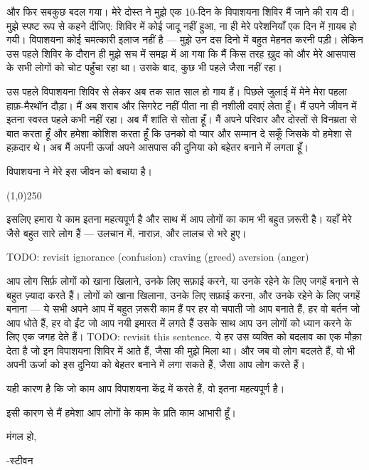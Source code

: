 \documentclass{article}
\begin{document}
और फिर सबकुछ बदल गया। मेरे दोस्त ने मुझे एक 10-दिन के विपाशयना शिविर मैं जाने की राय दी। मुझे स्पष्ट
रूप से कहने दीजिए: शिविर में कोई जादू नहीं हुआ, ना ही मेरे परेशनियाँ एक दिन में ग़ायब हो गयी।
विपाशयना कोई चमत्कारी इलाज नहीं है --- मुझे उन दस दिनो में बहुत मेहनत करनी पड़ी। लेकिन उस पहले
शिविर के दौरान ही मुझे सच में समझ में आ गया कि मैं किस तरह ख़ुद को और मेरे आसपास के सभी लोगों को चोट
पहुँचा रहा था। उसके बाद, कुछ भी पहले जैसा नहीं रहा।

उस पहले विपाशयना शिविर से लेकर अब तक सात साल हो गाय हैं। पिछले जुलाई में मेने मेरा पहला हाफ़-मैरथॉन
दौड़ा। मैं अब शराब और सिगरेट नहीं पीता ना ही नशीली दवाएं लेता हूँ। मैं उपने जीवन में इतना स्वस्त पहले
कभी नहीं रहा। अब मैं शांति से सोता हूँ। मैं अपने परिवार और दोस्तों से विनम्रता से बात करता हूँ और हमेशा
कोशिश करता हूँ कि उनको वो प्यार और सम्मान दे सकूँ जिसके वो हमेशा से हक़दार थे। अब मैं अपनी ऊर्जा अपने
आसपास की दुनिया को बहेतर बनाने में लगता हूँ।

विपाशयना ने मेरे इस जीवन को बचाया है।

\begin{center}
\line(1,0){250}
\end{center}

इसलिए हमारा ये काम इतना महत्यपूर्ण है और साथ में आप लोगों का काम भी बहुत ज़रूरी है। यहाँ मेरे जैसे बहुत
सारे लोग हैं --- उलचान में, नाराज़, और लालच से भरे हुए।

TODO: revisit
ignorance (confusion)
craving (greed)
aversion (anger)

आप लोग सिर्फ़ लोगों को खाना खिलाने, उनके लिए सफ़ाई करने, या उनके रहेने के लिए जगहें बनाने से बहुत
ज़्यादा करते हैं। लोगों को खाना खिलाना, उनके लिए सफ़ाई करना, और उनके रहेने के लिए जगहें बनाना --- ये
सभी अपने आप में बहुत ज़रूरी काम हैं पर हर वो चपाती जो आप बनाते हैं, हर वो बर्तन जो आप धोते हैं, हर
वो ईंट जो आप नयी इमारत में लगते हैं उसके साथ आप उन लोगों को ध्यान करने के लिए एक जगह देते हैं। TODO:
revisit this sentence. ये हर उस व्यक्ति को बदलाव का एक मौक़ा देता है जो इन विपाशयना शिविर में
आते हैं, जैसा की मुझे मिला था। और जब वो लोग बदलते हैं, वो भी अपनी ऊर्जा को इस दुनिया को बेहतर
बनाने में लगा सकते हैं, जैसा आप लोग करते हैं।

यही कारण है कि जो काम आप विपाशयना केंद्र में करते हैं, वो इतना महत्यपूर्ण है।

इसी कारण से मैं हमेशा आप लोगों के काम के प्रति काम आभारी हूँ।

मंगल हो,

-स्टीवन
\end{document}

